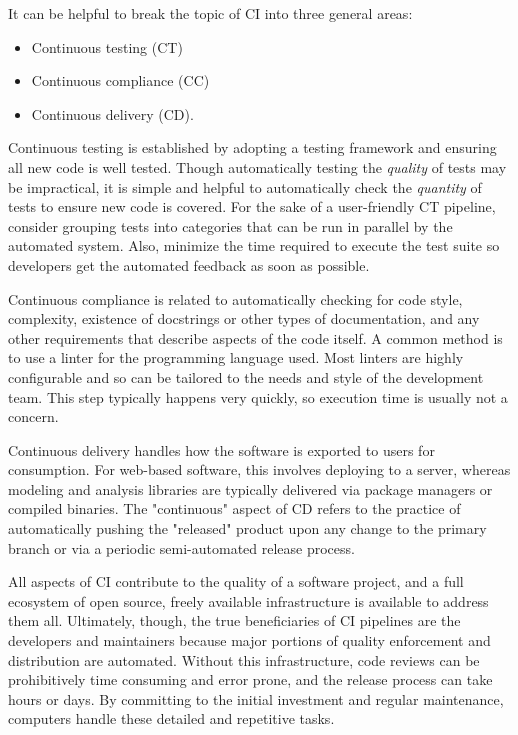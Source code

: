 \documentclass[]{nrel}
\begin{document}
It can be helpful to break the topic of CI into three general areas:
\begin{itemize}
\item Continuous testing (CT)
\item Continuous compliance (CC)
\item Continuous delivery (CD).
\end{itemize}

Continuous testing is established by adopting a testing framework and ensuring all
new code is well tested. Though automatically testing the \textit{quality} of tests may be impractical,
it is simple and helpful to automatically check the \textit{quantity} of tests to ensure new
code is covered.
For the sake of a user-friendly CT pipeline, consider grouping tests into categories
that can be run in parallel by the automated system.
Also, minimize the time required to execute the test suite so developers get
the automated feedback as soon as possible.

Continuous compliance is related to automatically checking for code style, complexity,
existence of docstrings or other types of documentation, and any other requirements
that describe aspects of the code itself.
A common method is to use a linter for the programming language used.
Most linters are highly configurable and so can be tailored to the needs and style of
the development team.
This step typically happens very quickly, so execution time is usually not a concern.

Continuous delivery handles how the software is exported to users for consumption.
For web-based software, this involves deploying to a server, whereas modeling and analysis
libraries are typically delivered via package managers or compiled binaries.
The "continuous" aspect of CD refers to the practice of automatically pushing the
"released" product upon any change to the primary branch or via a periodic semi-automated
release process.

All aspects of CI contribute to the quality of a software project, and a full ecosystem
of open source, freely available infrastructure is available to address them all.
Ultimately, though, the true beneficiaries of CI pipelines are the developers and maintainers
because major portions of quality enforcement and distribution are automated.
Without this infrastructure, code reviews can be prohibitively time consuming and error prone,
and the release process can take hours or days.
By committing to the initial investment and regular maintenance, computers handle
these detailed and repetitive tasks.
\end{document}
